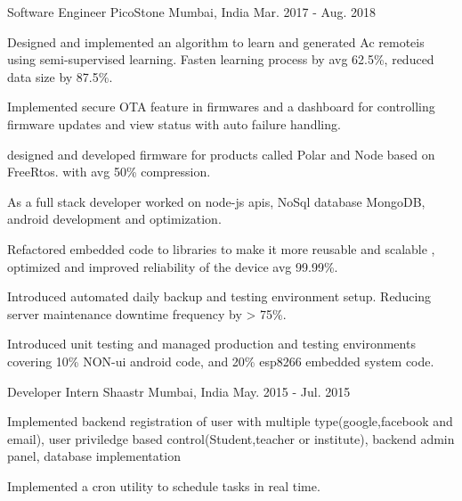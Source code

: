 

\begin{cventries}

	\cventry
	{Software Engineer} %
	{PicoStone} %
	{Mumbai, India} %
	{Mar. 2017 - Aug. 2018} %
	{ \begin{cvitems} %
			\item{Designed and implemented an algorithm to learn and generated Ac remoteis using semi-supervised learning. Fasten learning process by avg 62.5\%, reduced data size by 87.5\%.} %
      \item {Implemented secure OTA feature in firmwares and a dashboard for controlling firmware updates and view status with auto failure handling.}
      \item {designed and developed firmware for products called Polar and Node based on FreeRtos. with avg 50\% compression.}  %
      \item {As a full stack developer worked on node-js apis, NoSql database MongoDB, android development and optimization.}
      \item {Refactored embedded code to libraries to make it more reusable and scalable , optimized and improved reliability of the device avg 99.99\%.}  %
      \item {Introduced automated daily backup  and testing environment setup. Reducing server maintenance downtime frequency by > 75\%.}
      \item {Introduced unit testing and managed production and testing environments covering 10\% NON-ui android code, and 20\% esp8266 embedded system code.}
     \end{cvitems}
  }


	\cventry
	{Developer Intern} %
	{Shaastr } %
	{Mumbai, India} %
	{May. 2015 - Jul. 2015} %
	{
		\begin{cvitems} %
			\item {Implemented backend registration of user with multiple type(google,facebook and email), user priviledge based control(Student,teacher or institute), backend admin panel, database implementation}
			\item {Implemented a cron utility to schedule tasks in real time.}
		\end{cvitems}
	}

\end{cventries}
